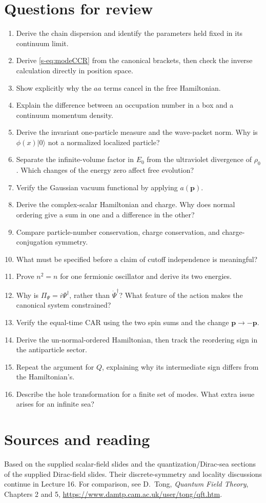\documentclass[11pt]{article}
\newcommand{\vac}{\lvert0\rangle}
\begin{document}
\newpage
\section*{Questions for review}
\begin{enumerate}
\item Derive the chain dispersion and identify the parameters held fixed
in its continuum limit.
\item Derive \eqref{s-eq:modeCCR} from the canonical brackets, then check the
inverse calculation directly in position space.
\item Show explicitly why the \(aa\) terms cancel in the free Hamiltonian.
\item Explain the difference between an occupation number in a box and a
continuum momentum density.
\item Derive the invariant one-particle measure and the wave-packet norm.
Why is \(\phi(x)\vac\) not a normalized localized particle?
\item Separate the infinite-volume factor in \(E_0\) from the ultraviolet
divergence of \(\rho_0\). Which changes of the energy zero affect free evolution?
\item Verify the Gaussian vacuum functional by applying \(a(\bm p)\).
\item Derive the complex-scalar Hamiltonian and charge. Why does normal
ordering give a sum in one and a difference in the other?
\item Compare particle-number conservation, charge conservation, and
charge-conjugation symmetry.
\item What must be specified before a claim of cutoff independence is meaningful?
\item Prove \(n^2=n\) for one fermionic oscillator and derive its two energies.
\item Why is \(\Pi_\Psi=i\Psi^\dagger\), rather than \(\dot\Psi^\dagger\)?
What feature of the action makes the canonical system constrained?
\item Verify the equal-time CAR using the two spin sums and the change
\(\bm p\to-\bm p\).
\item Derive the un-normal-ordered Hamiltonian, then track the reordering
sign in the antiparticle sector.
\item Repeat the argument for \(Q\), explaining why its intermediate sign
differs from the Hamiltonian's.
\item Describe the hole transformation for a finite set of modes.
What extra issue arises for an infinite sea?
\end{enumerate}

\section*{Sources and reading}
Based on the supplied scalar-field slides and the quantization/Dirac-sea
sections of the supplied Dirac-field slides. Their discrete-symmetry and
locality discussions continue in Lecture 16. For comparison, see D.~Tong,
\emph{Quantum Field Theory}, Chapters 2 and 5,
\url{https://www.damtp.cam.ac.uk/user/tong/qft.htm}.
\end{document}
